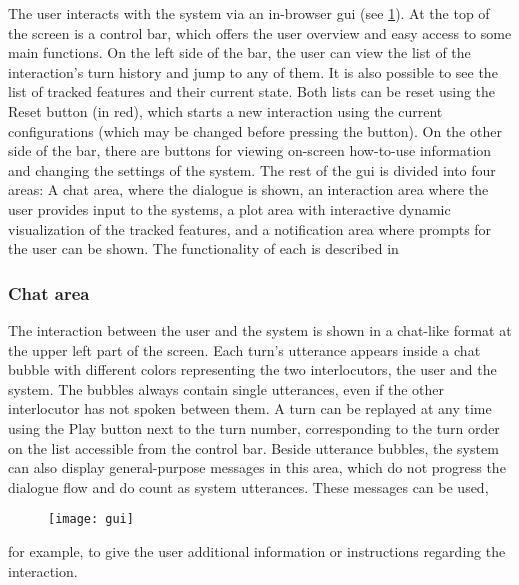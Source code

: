 The user interacts with the system via an in-browser \ac{gui} (see \cref{fig:gui}).
At the top of the screen is a control bar, which offers the user overview and easy access to some main functions.
On the left side of the bar, the user can view the list of the interaction's turn history and jump to any of them.
It is also possible to see the list of tracked features and their current state.
Both lists can be reset using the Reset button (in red), which starts a new interaction using the current configurations (which may be changed before pressing the button).
On the other side of the bar, there are buttons for viewing on-screen how-to-use information and changing the settings of the system.
The rest of the \ac{gui} is divided into four areas:
A chat area, where the dialogue is shown,
an interaction area where the user provides input to the systems,
a plot area with interactive dynamic visualization of the tracked features,
and a notification area where prompts for the user can be shown.
The functionality of each is described in 

\subsubsection{Chat area}
\label{subsubsec:chat_area}

The interaction between the user and the system is shown in a chat-like format at the upper left part of the screen.
Each turn's utterance appears inside a chat bubble with different colors representing the two interlocutors, the user and the system.
The bubbles always contain single utterances, even if the other interlocutor has not spoken between them.
A turn can be replayed at any time using the Play button next to the turn number, corresponding to the turn order on the list accessible from the control bar.
Beside utterance bubbles, the system can also display general-purpose messages in this area, which do not progress the dialogue flow and do count as system utterances.
These messages can be used,
%
\begin{landscape}
	\begin{figure}[t]
		\centering
		\vspace*{-2cm}
		\hspace*{-2cm}
		\texttt{[image: gui]}
		\caption[Web system in-browser \acs{gui}]
			{}
		\label{fig:gui}
	\end{figure}
\end{landscape}
\noindent
for example, to give the user additional information or instructions regarding the interaction.

